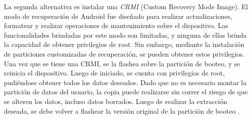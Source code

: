 La segunda alternativa es instalar una \emph{CRMI} (Custom Recovery Mode Image). El modo de recuperación de Android fue diseñado para realizar actualizaciones, formatear y realizar operaciones de mantenimiento sobre el dispositivo. Las funcionalidades brindadas por este modo son limitadas, y ninguna de ellas brinda la capacidad de obtener privilegios de root. Sin embargo, mediante la instalación de particiones customizadas de recuperación, se pueden obtener estos privilegios. 
Una vez que se tiene una CRMI, se la flashea sobre la partición de booteo, y se reinicia el dispositivo. Luego de iniciado, se cuenta con privilegios de root, pudiéndose obtener todos los datos deseados. Dado que no es necesario montar la partición de datos del usuario, la copia puede realizarse sin correr el riesgo de que se alteren los datos, incluso datos borrados. Luego de realizar la extracción deseada, se debe volver a flashear la versión original de la partición de booteo \cite{dataintegr}.